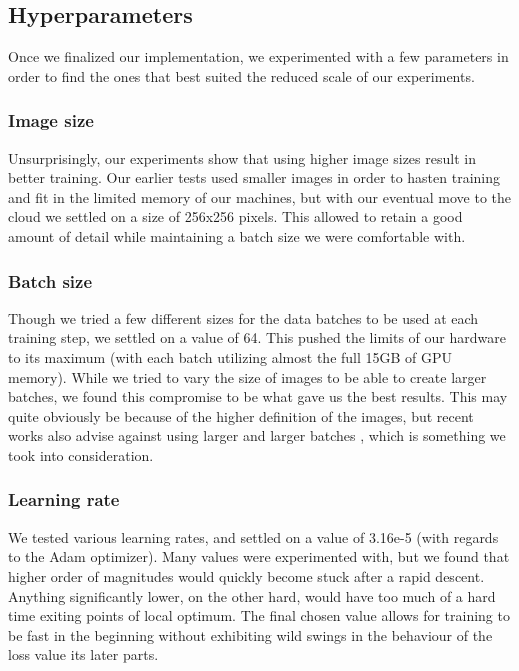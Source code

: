 \documentclass[twoside,twocolumn]{article}
\begin{document}
\subsection{Hyperparameters}

Once we finalized our implementation, we experimented with a few parameters in order to find the ones that best suited the reduced scale of our experiments.

\subsubsection{Image size}
Unsurprisingly, our experiments show that using higher image sizes result in better training. Our earlier tests used smaller images in order to hasten training and fit in the limited memory of our machines, but with our eventual move to the cloud we settled on a size of 256x256 pixels. This allowed to retain a good amount of detail while maintaining a batch size we were comfortable with.

\subsubsection{Batch size}
Though we tried a few different sizes for the data batches to be used at each training step, we settled on a value of 64. This pushed the limits of our hardware to its maximum (with each batch utilizing almost the full 15GB of GPU memory). While we tried to vary the size of images to be able to create larger batches, we found this compromise to be what gave us the best results. This may quite obviously be because of the higher definition of the images, but recent works also advise against using larger and larger batches \cite{Nitish:2017}, which is something we took into consideration.

\subsubsection{Learning rate}
We tested various learning rates, and settled on a value of  3.16e-5 (with regards to the Adam optimizer). Many values were experimented with, but we found that higher order of magnitudes would quickly become stuck after a rapid descent. Anything significantly lower, on the other hard, would have too much of a hard time exiting points of local optimum. 
The final chosen value allows for training to be fast in the beginning without exhibiting wild swings in the behaviour of the loss value its later parts. 
\end{document}
